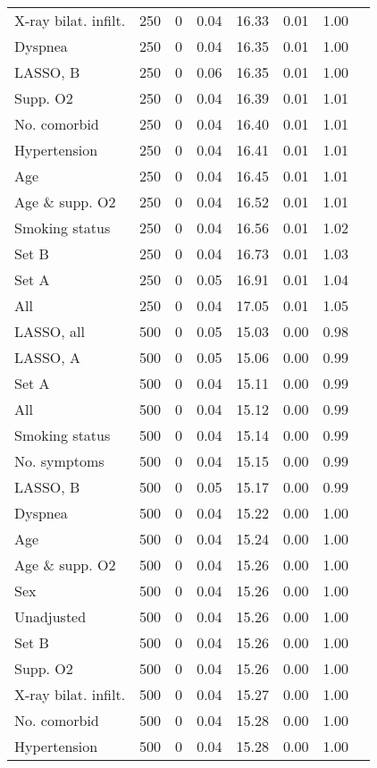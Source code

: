 \documentclass{article}
\begin{document}
{\begin{longtable}{lccccccc}
X-ray bilat. infilt. & 250 & 0 & 0.04 & 16.33 & 0.01 & 1.00\\
Dyspnea & 250 & 0 & 0.04 & 16.35 & 0.01 & 1.00\\
LASSO, B & 250 & 0 & 0.06 & 16.35 & 0.01 & 1.00\\
Supp. O2 & 250 & 0 & 0.04 & 16.39 & 0.01 & 1.01\\
No. comorbid & 250 & 0 & 0.04 & 16.40 & 0.01 & 1.01\\
Hypertension & 250 & 0 & 0.04 & 16.41 & 0.01 & 1.01\\
Age & 250 & 0 & 0.04 & 16.45 & 0.01 & 1.01\\
Age \& supp. O2 & 250 & 0 & 0.04 & 16.52 & 0.01 & 1.01\\
Smoking status & 250 & 0 & 0.04 & 16.56 & 0.01 & 1.02\\
Set B & 250 & 0 & 0.04 & 16.73 & 0.01 & 1.03\\
Set A & 250 & 0 & 0.05 & 16.91 & 0.01 & 1.04\\
All & 250 & 0 & 0.04 & 17.05 & 0.01 & 1.05\\ \midrule
LASSO, all & 500 & 0 & 0.05 & 15.03 & 0.00 & 0.98\\
LASSO, A & 500 & 0 & 0.05 & 15.06 & 0.00 & 0.99\\
Set A & 500 & 0 & 0.04 & 15.11 & 0.00 & 0.99\\
All & 500 & 0 & 0.04 & 15.12 & 0.00 & 0.99\\
Smoking status & 500 & 0 & 0.04 & 15.14 & 0.00 & 0.99\\
No. symptoms & 500 & 0 & 0.04 & 15.15 & 0.00 & 0.99\\
LASSO, B & 500 & 0 & 0.05 & 15.17 & 0.00 & 0.99\\
Dyspnea & 500 & 0 & 0.04 & 15.22 & 0.00 & 1.00\\
Age & 500 & 0 & 0.04 & 15.24 & 0.00 & 1.00\\
Age \& supp. O2 & 500 & 0 & 0.04 & 15.26 & 0.00 & 1.00\\
Sex & 500 & 0 & 0.04 & 15.26 & 0.00 & 1.00\\
Unadjusted & 500 & 0 & 0.04 & 15.26 & 0.00 & 1.00\\
Set B & 500 & 0 & 0.04 & 15.26 & 0.00 & 1.00\\
Supp. O2 & 500 & 0 & 0.04 & 15.26 & 0.00 & 1.00\\
X-ray bilat. infilt. & 500 & 0 & 0.04 & 15.27 & 0.00 & 1.00\\
No. comorbid & 500 & 0 & 0.04 & 15.28 & 0.00 & 1.00\\
Hypertension & 500 & 0 & 0.04 & 15.28 & 0.00 & 1.00\\

\end{longtable}}
\end{document}
